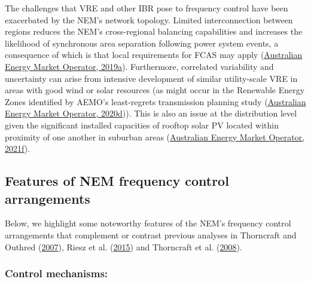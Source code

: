 \documentclass[12pt,a4paper,]{report}
\begin{document}
The challenges that VRE and other IBR pose to frequency control have
been exacerbated by the NEM's network topology. Limited interconnection
between regions reduces the NEM's cross-regional balancing capabilities
and increases the likelihood of synchronous area separation following
power system events, a consequence of which is that local requirements
for FCAS may apply
(\protect\hyperlink{ref-australianenergymarketoperatorMaintainingPowerSystem2019}{Australian
Energy Market Operator, 2019a}). Furthermore, correlated variability and
uncertainty can arise from intensive development of similar
utility-scale VRE in areas with good wind or solar resources (as might
occur in the Renewable Energy Zones identified by AEMO's least-regrets
transmission planning study
(\protect\hyperlink{ref-australianenergymarketoperator2020IntegratedSystem2020}{Australian
Energy Market Operator, 2020d})). This is also an issue at the
distribution level given the significant installed capacities of rooftop
solar PV located within proximity of one another in suburban areas
(\protect\hyperlink{ref-australianenergymarketoperatorEnduringPrimaryFrequency2021}{Australian
Energy Market Operator, 2021f}).

\hypertarget{features-of-nem-frequency-control-arrangements}{%
\subsection{Features of NEM frequency control
arrangements}\label{features-of-nem-frequency-control-arrangements}}

Below, we highlight some noteworthy features of the NEM's frequency
control arrangements that complement or contrast previous analyses in
Thorncraft and Outhred
(\protect\hyperlink{ref-thorncraftExperienceMarketbasedAncillary2007}{2007}),
Riesz et al.
(\protect\hyperlink{ref-rieszFrequencyControlAncillary2015}{2015}) and
Thorncraft et al.
(\protect\hyperlink{ref-thorncraftMarketbasedAncillaryServices2008}{2008}).

\hypertarget{control-mechanisms}{%
\subsubsection{Control mechanisms:}\label{control-mechanisms}}
\end{document}
